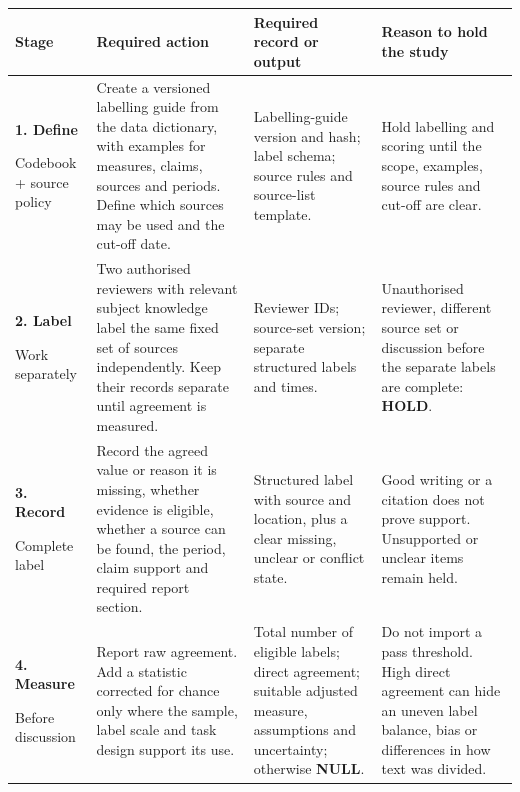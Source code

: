 \clearpage
\begin{table}[p]
  \centering
  \footnotesize
  \setlength{\tabcolsep}{2.1pt}
  \renewcommand{\arraystretch}{1.14}
  \begin{tabularx}{\textwidth}{@{}P{0.15\textwidth}P{0.38\textwidth}P{0.19\textwidth}Y@{}}
    \toprule
    \textbf{Stage} &
    \textbf{Required action} &
    \textbf{Required record or output} &
    \textbf{Reason to hold the study} \\
    \midrule

    \textbf{1. Define}\par Codebook + source policy &
    Create a versioned labelling guide from the data dictionary, with examples for measures, claims, sources and periods. Define which sources may be used and the cut-off date. &
    Labelling-guide version and hash; label schema; source rules and source-list template. &
    Hold labelling and scoring until the scope, examples, source rules and cut-off are clear. \\

    \addlinespace[1.5pt]
    \textbf{2. Label}\par Work separately &
    Two authorised reviewers with relevant subject knowledge label the same fixed set of sources independently. Keep their records separate until agreement is measured. &
    Reviewer IDs; source-set version; separate structured labels and times. &
    Unauthorised reviewer, different source set or discussion before the separate labels are complete: \textbf{HOLD}. \\

    \addlinespace[1.5pt]
    \textbf{3. Record}\par Complete label &
    Record the agreed value or reason it is missing, whether evidence is eligible, whether a source can be found, the period, claim support and required report section. &
    Structured label with source and location, plus a clear missing, unclear or conflict state. &
    Good writing or a citation does not prove support. Unsupported or unclear items remain held. \\

    \addlinespace[1.5pt]
    \textbf{4. Measure}\par Before discussion &
    Report raw agreement. Add a statistic corrected for chance only where the sample, label scale and task design support its use. &
    Total number of eligible labels; direct agreement; suitable adjusted measure, assumptions and uncertainty; otherwise \textbf{NULL}. &
    Do not import a pass threshold. High direct agreement can hide an uneven label balance, bias or differences in how text was divided. \\


\end{tabularx}
\end{table}
